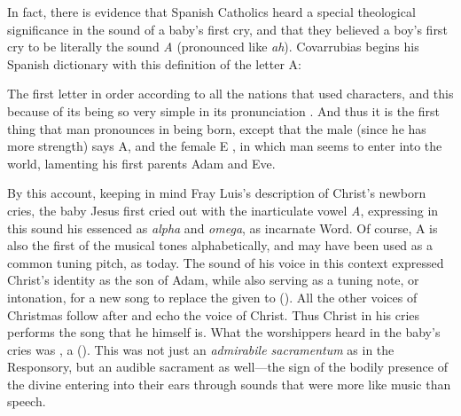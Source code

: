 In fact, there is evidence that Spanish Catholics heard a special theological
significance in the sound of a baby's first cry, and that they believed a boy's
first cry to be literally the sound \emph{A} (pronounced like \emph{ah}).
Covarrubias begins his Spanish dictionary with this definition of the letter A:
\begin{quoting}
The first letter in order according to all the nations that used characters,
\Dots{} and this because of its being so very simple in its pronunciation
. \Dots{} 
    And thus it is the first thing that man pronounces in
being born, except that the male (since he has more strength) says A, and the
female E , in which man seems to enter into the world,
lamenting his first parents Adam and Eve.%
\Autocites
    [:
    .]
    {Covarrubias:Tesoro}
    [On symbolic alphabets in early modern devotional music, see][38--40]
    {Kendrick:Jeremiah}
\end{quoting}
By this account, keeping in mind Fray Luis's description of Christ's newborn
cries, the baby Jesus first cried out with the inarticulate vowel \emph{A},
expressing in this sound his essenced as \emph{alpha} and \emph{omega}, as
incarnate Word.
Of course, A is also the first of the musical tones alphabetically, and may have
been used as a common tuning pitch, as today.
The sound of his voice in this context expressed Christ's identity as the son of
Adam, while also serving as a tuning note, or intonation, for a new song to
replace the  given to 
().
All the other voices of Christmas follow after and echo the voice of Christ.
Thus Christ in his cries performs the song that he himself is.
What the worshippers heard in the baby's cries was , a  ().
This was not just an \emph{admirabile sacramentum} as in the Responsory, but an
audible sacrament as well---the sign of the bodily presence of the divine
entering into their ears through sounds that were more like music than speech.

